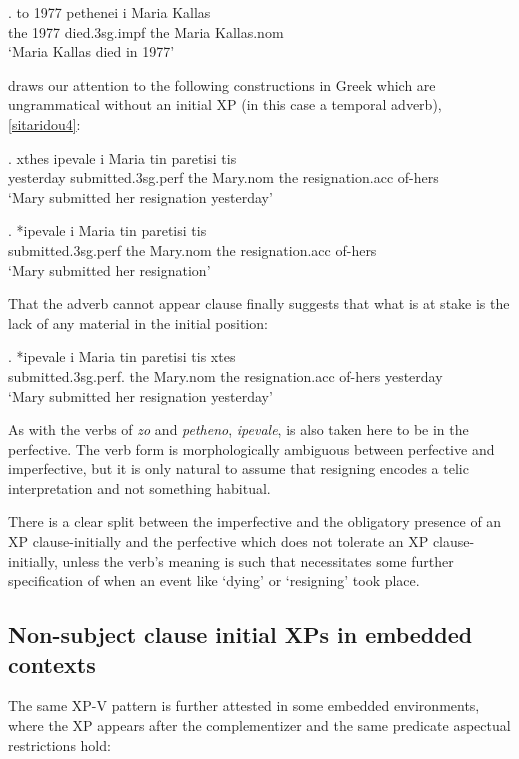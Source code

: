 \documentclass[11pt]{article}
\begin{document}
\exg.
to 1977 pethenei i Maria Kallas\\
the 1977 died.3sg.impf the Maria Kallas.nom\\ \label{greek256}
`Maria Kallas died in 1977'

\citet{sitaridou:12} draws our attention to the following constructions in Greek which are ungrammatical without an initial XP (in this case a temporal adverb), \ref{sitaridou4}: 

\exg.
xthes ipevale i Maria tin paretisi tis\\
yesterday submitted.3sg.perf the Mary.nom the resignation.acc of-hers\\ \label{sitaridou3}
`Mary submitted her resignation yesterday'

\exg.
*ipevale i Maria tin paretisi tis\\
submitted.3sg.perf the Mary.nom the resignation.acc of-hers\\ \label{sitaridou4}
`Mary submitted her resignation'

\hfill \citet[pp. 583]{sitaridou:12}

That the adverb cannot appear clause finally suggests that what is at stake is the lack of any material in the initial position:

\exg.
*ipevale i Maria tin paretisi tis xtes\\
submitted.3sg.perf. the Mary.nom the resignation.acc of-hers yesterday\\ \label{sitaridou5}
`Mary submitted her resignation yesterday'

As with the verbs of \textit{zo} and \textit{petheno}, \textit{ipevale}, is also taken here to be in the perfective. The verb form is morphologically ambiguous between perfective and imperfective, but it is only natural to assume that resigning encodes a telic interpretation and not something habitual.  

There is a clear split between the imperfective and the obligatory presence of an XP clause-initially and the perfective which does not tolerate an XP clause-initially, unless the verb's meaning is such that necessitates some further specification of when an event like `dying' or `resigning' took place. 

\subsection{Non-subject clause initial XPs in embedded contexts}

The same XP-V pattern is further attested in some embedded environments, where the XP appears after the complementizer and the same predicate aspectual restrictions hold:
\end{document}
